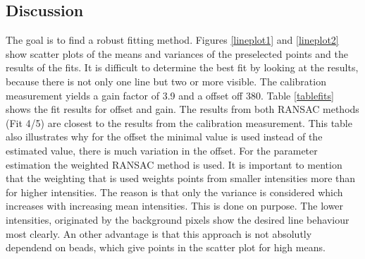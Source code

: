 \subsection{Discussion} 
The goal is to find a robust fitting method. Figures \ref{lineplot1} and \ref{lineplot2} show scatter plots of the means and variances of the preselected points and the results of the fits.
It is difficult to determine the best fit by looking at the results, because there is not only one line but two or more visible.
The calibration measurement yields a gain factor of 3.9 and a offset off 380. Table \ref{tablefits} shows the fit results for offset and gain. The results from both RANSAC methods (Fit 4/5) are closest to the results from the calibration measurement. This table also illustrates why for the offset the minimal value is used instead of the estimated value, there is much variation in the offset.\newline
For the parameter estimation the weighted RANSAC method is used.\newline
It is important to mention that the weighting that is used weights points from smaller intensities more than for higher intensities. The reason is that only the variance is considered which increases with increasing mean intensities. This is done on purpose. The lower intensities, originated by the background pixels show the desired line behaviour most clearly. An other advantage is that this approach is not absolutly dependend on beads, which give points in the scatter plot for high means. 



